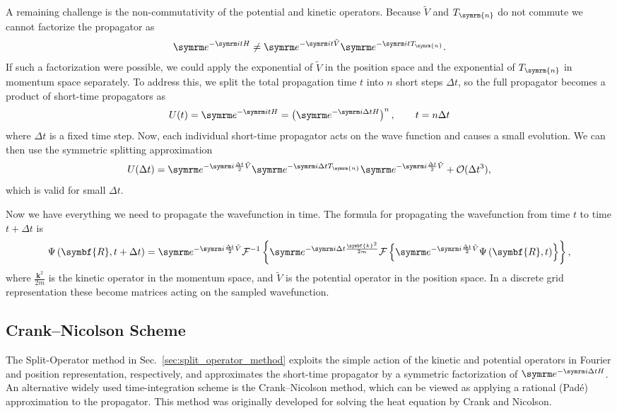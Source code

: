 A remaining challenge is the non-commutativity of the potential and kinetic operators. Because $\tilde{V}$ and $T_{\symrm{n}}$ do not commute we cannot factorize the propagator as
\begin{equation}
\e^{-\i tH}\neq\e^{-\i t\tilde{V}}\e^{-\i tT_{\symrm{n}}}.
\end{equation}
If such a factorization were possible, we could apply the exponential of $\tilde{V}$ in the position space and the exponential of $T_{\symrm{n}}$ in momentum space separately. To address this, we split the total propagation time $t$ into $n$ short steps $\Delta t$, so the full propagator becomes a product of short-time propagators as
\begin{equation}
U(t)=\e^{-\i tH}=\left(\e^{-\i\Delta tH}\right)^n,\qquad t=n\Delta t
\end{equation}
where $\Delta t$ is a fixed time step. Now, each individual short-time propagator acts on the wave function and causes a small evolution. We can then use the symmetric splitting approximation
\begin{equation}
U(\Delta t)=\e^{-\i\frac{\Delta t}{2}\tilde{V}}\e^{-\i\Delta tT_{\symrm{n}}}\e^{-\i\frac{\Delta t}{2}\tilde{V}}+\mathcal{O}(\Delta t^3),
\end{equation}
which is valid for small $\Delta t$.

Now we have everything we need to propagate the wavefunction in time. The formula for propagating the wavefunction from time $t$ to time $t+\Delta t$ is
\begin{equation}\label{eq:split_operator_propagation}
\Psi\left(\symbf{R},t+\Delta t\right)=\e^{-\i\frac{\Delta t}{2}\tilde V}\mathcal{F}^{-1}\left\lbrace\e^{-\i\Delta t\frac{\symbf{k}^2}{2m}}\mathcal{F}\left\lbrace\e^{-\i\frac{\Delta t}{2}\tilde V}\Psi\left(\symbf{R},t\right)\right\rbrace\right\rbrace,
\end{equation}
where $\frac{\symbf{k}^2}{2m}$ is the kinetic operator in the momentum space, and $\tilde{V}$ is the potential operator in the position space. In a discrete grid representation these become matrices acting on the sampled wavefunction.
\subsection{Crank--Nicolson Scheme}\label{sec:crank_nicolson_scheme}
The Split-Operator method in Sec.~\ref{sec:split_operator_method} exploits the simple action of the kinetic and potential operators in Fourier and position representation, respectively, and approximates the short-time propagator by a symmetric factorization of $\e^{-\i\Delta t H}$. An alternative widely used time-integration scheme is the Crank--Nicolson method, which can be viewed as applying a rational (Padé) approximation to the propagator. This method was originally developed for solving the heat equation by Crank and Nicolson.\supercite{10.1017/S0305004100023197}


